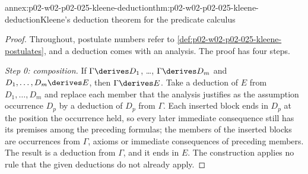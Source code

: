 \begin{annexitem}{annex:p02-w02-p02-025-kleene-deduction}{thm:p02-w02-p02-025-kleene-deduction}{Kleene's deduction theorem for the predicate calculus}
\begin{proof}
Throughout, postulate numbers refer to
\cref{def:p02-w02-p02-025-kleene-postulates}, and a deduction comes with an
analysis.  The proof has four steps.

\emph{Step 0: composition.}  If \(\Gamma\derives D_1\), \ldots,
\(\Gamma\derives D_m\) and \(D_1,\ldots,D_m\derives E\), then
\(\Gamma\derives E\).  Take a deduction of \(E\) from \(D_1,\ldots,D_m\) and
replace each member that the analysis justifies as the assumption occurrence
\(D_p\) by a deduction of \(D_p\) from \(\Gamma\).  Each inserted block ends
in \(D_p\) at the position the occurrence held, so every later immediate
consequence still has its premises among the preceding formulas; the members
of the inserted blocks are occurrences from \(\Gamma\), axioms or immediate
consequences of preceding members.  The result is a deduction from
\(\Gamma\), and it ends in \(E\).  The construction applies no rule that the
given deductions do not already apply.


\end{proof}
\end{annexitem}
